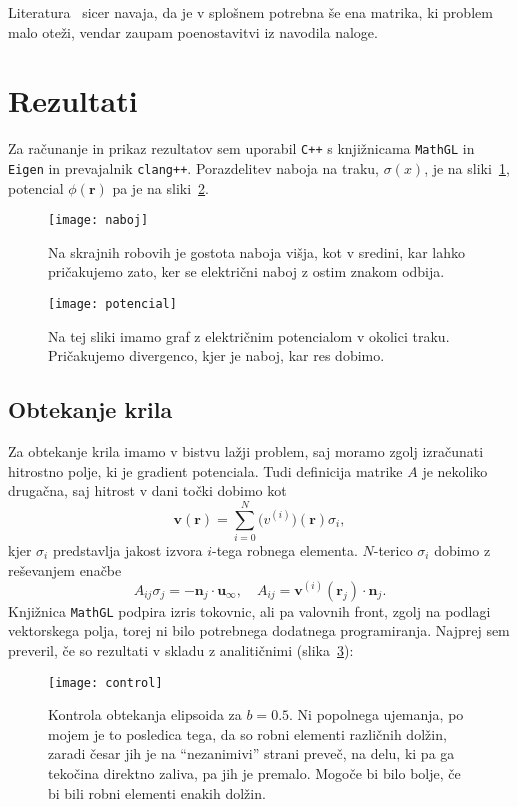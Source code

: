 \documentclass[a4 paper, 12pt]{article}
\renewcommand{\r}{
	\ensuremath{\mathbf{r}}
}
\begin{document}
Literatura~\cite[str.~659]{sirca} sicer navaja, da je v splo\v snem potrebna \v se ena matrika, ki problem malo
ote\v zi, vendar zaupam poenostavitvi iz navodila naloge.
\section{Rezultati}

Za ra\v cunanje in prikaz rezultatov sem uporabil {\tt C++} s knji\v znicama {\tt MathGL} in {\tt Eigen} in
prevajalnik {\tt clang++}. Porazdelitev naboja na traku, $\sigma(x)$, je na sliki~\ref{gr1}, potencial $\phi(\r)$ pa je
na sliki~\ref{gr2}.

\begin{figure}[H]\centering
	\texttt{[image: naboj]}
	\caption{Na skrajnih robovih je gostota naboja vi\v sja, kot v sredini, kar lahko
		pri\v cakujemo zato, ker se elektri\v cni naboj z ostim znakom odbija.}
	\label{gr1}
\end{figure}

\begin{figure}[H]\centering
	\texttt{[image: potencial]}
	\caption{Na tej sliki imamo graf z elektri\v cnim potencialom v okolici traku. Pri\v cakujemo
		divergenco, kjer je naboj, kar res dobimo.}
	\label{gr2}
\end{figure}

\subsection{Obtekanje krila}

Za obtekanje krila imamo v bistvu la\v zji problem, saj moramo zgolj izra\v cunati hitrostno polje, ki je
gradient potenciala. Tudi definicija matrike $A$ je nekoliko druga\v cna, saj hitrost v dani to\v cki
dobimo kot
\[
	\mathbf{v}(\r) = \sum_{i = 0}^N \mathbf(v^{(i)})(\r) \sigma_i,
\]
kjer $\sigma_i$ predstavlja jakost izvora $i$-tega robnega elementa. $N$-terico $\sigma_i$ dobimo z
re\v sevanjem ena\v cbe
\[
	A_{ij}\sigma_j = -\mathbf{n}_j \cdot \mathbf{u}_{\infty}, \quad A_{ij} = \mathbf{v}^{(i)}(\r_j)
		\cdot \mathbf{n}_j.
\]
Knji\v znica {\tt MathGL} podpira izris tokovnic, ali pa valovnih front, zgolj na podlagi vektorskega polja, torej
ni bilo potrebnega dodatnega programiranja. Najprej sem preveril, \v ce so rezultati v skladu z analiti\v cnimi
(slika~\ref{gr2.1}):

\begin{figure}[H]\centering
	\texttt{[image: control]}
	\caption{Kontrola obtekanja elipsoida za $b = 0.5$. Ni popolnega ujemanja, po mojem je to posledica tega,
		da so robni elementi razli\v cnih dol\v zin, zaradi \v cesar jih je na "`nezanimivi"' strani preve\v c,
		na delu, ki pa ga teko\v cina direktno zaliva, pa jih je premalo. Mogo\v ce bi bilo bolje, \v ce bi bili
		robni elementi enakih dol\v zin.}
	\label{gr2.1}
\end{figure}
\end{document}
